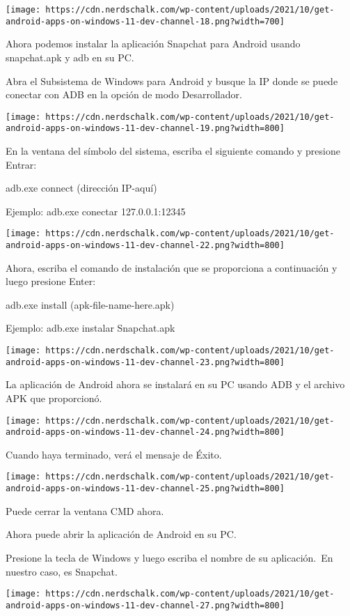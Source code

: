 \documentclass[
  letterpaper,
]{article}
\begin{document}
\texttt{[image: https://cdn.nerdschalk.com/wp-content/uploads/2021/10/get-android-apps-on-windows-11-dev-channel-18.png?width=700]}

Ahora podemos instalar la aplicación Snapchat para Android usando
snapchat.apk y adb en su PC.

Abra el Subsistema de Windows para Android y busque la IP donde se puede
conectar con ADB en la opción de modo Desarrollador.

\texttt{[image: https://cdn.nerdschalk.com/wp-content/uploads/2021/10/get-android-apps-on-windows-11-dev-channel-19.png?width=800]}

En la ventana del símbolo del sistema, escriba el siguiente comando y
presione Entrar:

adb.exe connect (dirección IP-aquí)

Ejemplo: adb.exe conectar 127.0.0.1:12345

\texttt{[image: https://cdn.nerdschalk.com/wp-content/uploads/2021/10/get-android-apps-on-windows-11-dev-channel-22.png?width=800]}

Ahora, escriba el comando de instalación que se proporciona a
continuación y luego presione Enter:

adb.exe install (apk-file-name-here.apk)

Ejemplo: adb.exe instalar Snapchat.apk

\texttt{[image: https://cdn.nerdschalk.com/wp-content/uploads/2021/10/get-android-apps-on-windows-11-dev-channel-23.png?width=800]}

La aplicación de Android ahora se instalará en su PC usando ADB y el
archivo APK que proporcionó.

\texttt{[image: https://cdn.nerdschalk.com/wp-content/uploads/2021/10/get-android-apps-on-windows-11-dev-channel-24.png?width=800]}

Cuando haya terminado, verá el mensaje de Éxito.

\texttt{[image: https://cdn.nerdschalk.com/wp-content/uploads/2021/10/get-android-apps-on-windows-11-dev-channel-25.png?width=800]}

Puede cerrar la ventana CMD ahora.

Ahora puede abrir la aplicación de Android en su PC.

Presione la tecla de Windows y luego escriba el nombre de su
aplicación.~En nuestro caso, es Snapchat.

\texttt{[image: https://cdn.nerdschalk.com/wp-content/uploads/2021/10/get-android-apps-on-windows-11-dev-channel-27.png?width=800]}
\end{document}
